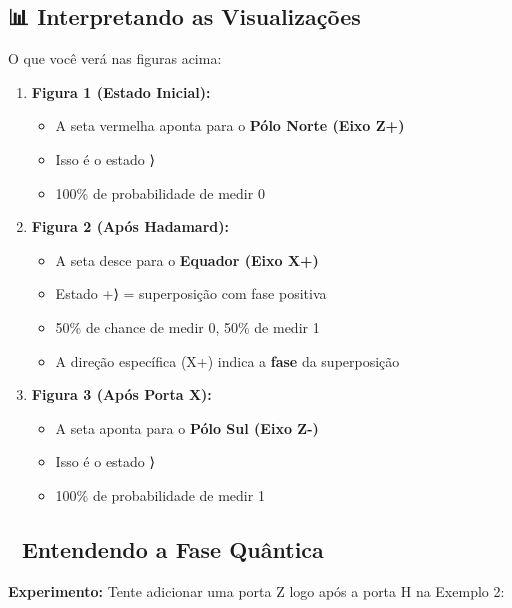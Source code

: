 \documentclass[
  brazilian,
]{report}
\providecommand{\tightlist}{%
  \setlength{\itemsep}{0pt}\setlength{\parskip}{0pt}}
\begin{document}
\subsection{📊 Interpretando as
Visualizações}\label{interpretando-as-visualizauxe7uxf5es}

O que você verá nas figuras acima:

\begin{enumerate}
\def\labelenumi{\arabic{enumi}.}
\tightlist
\item
  \textbf{Figura 1 (Estado Inicial):}

  \begin{itemize}
  \tightlist
  \item
    A seta vermelha aponta para o \textbf{Pólo Norte (Eixo Z+)}
  \item
    Isso é o estado ⟩
  \item
    100\% de probabilidade de medir 0
  \end{itemize}
\item
  \textbf{Figura 2 (Após Hadamard):}

  \begin{itemize}
  \tightlist
  \item
    A seta desce para o \textbf{Equador (Eixo X+)}
  \item
    Estado \textbar+⟩ = superposição com fase positiva
  \item
    50\% de chance de medir 0, 50\% de medir 1
  \item
    A direção específica (X+) indica a \textbf{fase} da superposição
  \end{itemize}
\item
  \textbf{Figura 3 (Após Porta X):}

  \begin{itemize}
  \tightlist
  \item
    A seta aponta para o \textbf{Pólo Sul (Eixo Z-)}
  \item
    Isso é o estado ⟩
  \item
    100\% de probabilidade de medir 1
  \end{itemize}
\end{enumerate}

\subsection{🎯 Entendendo a Fase
Quântica}\label{entendendo-a-fase-quuxe2ntica}

\textbf{Experimento:} Tente adicionar uma porta Z logo após a porta H na
Exemplo 2:
\end{document}
